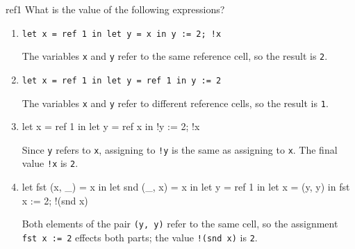 %
%
%
\exercises

%
\begin{exercise}{ref1}
What is the value of the following expressions?

\begin{enumerate}
\item \lstinline|let x = ref 1 in let y = x in y := 2; !x|

\begin{answer}\ifanswers
The variables \hbox{\lstinline/x/} and \hbox{\lstinline/y/} refer to the same reference cell, so the result is \hbox{\lstinline/2/}.
\fi\end{answer}

\item \lstinline|let x = ref 1 in let y = ref 1 in y := 2|

\begin{answer}\ifanswers
The variables \hbox{\lstinline/x/} and \hbox{\lstinline/y/} refer to different reference cells, so the result is \hbox{\lstinline/1/}.
\fi\end{answer}

\item

\begin{ocamllisting}
let x = ref 1 in
let y = ref x in
!y := 2;
!x
\end{ocamllisting}

\begin{answer}\ifanswers
Since \hbox{\lstinline/y/} refers to \hbox{\lstinline/x/}, assigning to \hbox{\lstinline/!y/} is the same as assigning to \hbox{\lstinline/x/}.
The final value \hbox{\lstinline/!x/} is \hbox{\lstinline/2/}.
\fi\end{answer}

\item

\begin{ocamllisting}
let fst (x, _) = x in
let snd (_, x) = x in
let y = ref 1 in
let x = (y, y) in
fst x := 2;
!(snd x)
\end{ocamllisting}

\begin{answer}\ifanswers
Both elements of the pair \hbox{\lstinline/(y, y)/} refer to the same cell, so the assignment \hbox{\lstinline/fst x := 2/}
effects both parts; the value \hbox{\lstinline/!(snd x)/} is \hbox{\lstinline/2/}.
\fi\end{answer}


\end{enumerate}
\end{exercise}
